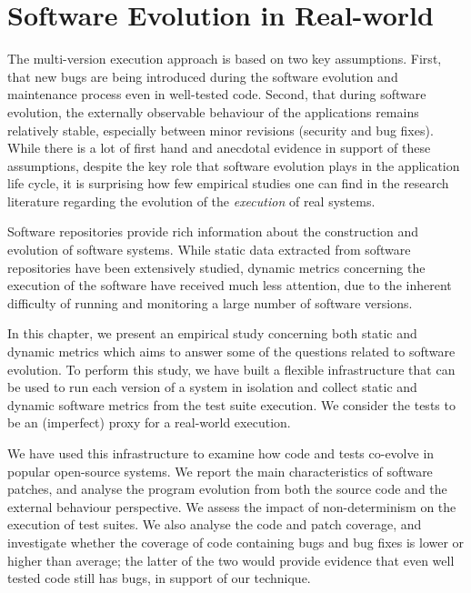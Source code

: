 \chapter{Software Evolution in Real-world}
\label{chap:evolution}

The multi-version execution approach is based on two key assumptions.  First,
that new bugs are being introduced during the software evolution and
maintenance process even in well-tested code. Second, that during software
evolution, the externally observable behaviour of the applications remains
relatively stable, especially between minor revisions (\ie security and bug
fixes).  While there is a lot of first hand and anecdotal evidence in support
of these assumptions, despite the key role that software evolution plays in the
application life cycle, it is surprising how few empirical studies one can find
in the research literature regarding the evolution of the \emph{execution} of
real systems.

Software repositories provide rich information about the construction and
evolution of software systems. While static data extracted from software
repositories have been extensively studied, dynamic metrics concerning the
execution of the software have received much less attention, due to the
inherent difficulty of running and monitoring a large number of software
versions.

In this chapter, we present an empirical study concerning both static and
dynamic metrics which aims to answer some of the questions related to software
evolution. To perform this study, we have built a flexible infrastructure that
can be used to run each version of a system in isolation and collect static and
dynamic software metrics from the test suite execution. We consider the tests
to be an (imperfect) proxy for a real-world execution.

We have used this infrastructure to examine how code and tests co-evolve in
\numSystems popular open-source systems. We report the main characteristics of
software patches, and analyse the program evolution from both the source code
and the external behaviour perspective. We assess the impact of non-determinism
on the execution of test suites. We also analyse the code and patch coverage,
and investigate whether the coverage of code containing bugs and bug fixes is
lower or higher than average; the latter of the two would provide evidence that
even well tested code still has bugs, in support of our technique.








